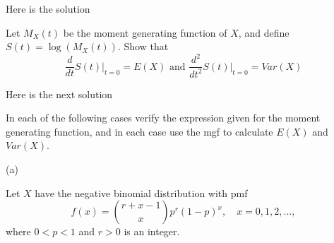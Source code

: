 \documentclass[12pt,letterpaper]{exam}
\begin{document}
\begin{questions}
	\begin{solution}
		Here is the solution
	\end{solution}
	
	\setcounter{question}{31}
	\question  Let $M_X(t)$ be the moment generating function of $X$, and define $S(t) = \log{(M_X(t))}$. Show that
	$$ \frac{d}{dt} \left. S(t) \right|_{t=0} = E(X) \text{ and }  \frac{d^2}{dt^2} \left. S(t) \right|_{t=0} = Var(X)$$
	\begin{solution}
		Here is the next solution
	\end{solution}
	
	\question  In each of the following cases verify the expression given for the moment generating function, and in each case use the mgf to calculate $E(X)$ and $Var(X)$.
	
	\begin{solution}
		(a)
	\end{solution}
	
	\setcounter{question}{37}
	\question  Let $X$ have the negative binomial distribution with pmf
	$$ f(x) = { r + x -1 \choose x} p^r (1-p)^x, \quad x= 0,1,2,...,$$
	where $0 < p< 1$ and $r >0$ is an integer.
\end{questions}
\end{document}
